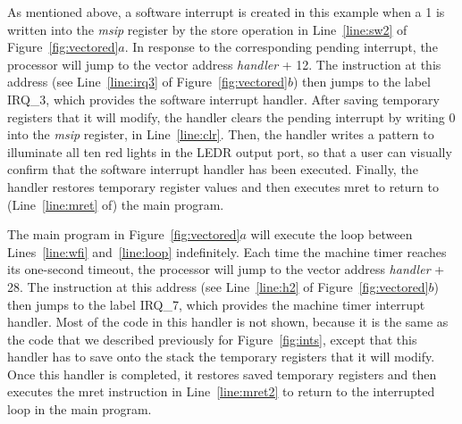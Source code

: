\documentclass[11pt, twoside, pdftex]{article}
\newcommand{\commonPath}{../../Common}
\begin{document}
As mentioned above, a software interrupt is created in this example when a 1 is written
into the {\it msip} register by the store operation in Line~\ref{line:sw2} of 
Figure~\ref{fig:vectored}$a$. In response to the corresponding pending interrupt,
the processor will jump to the vector address {\it handler} + 12. The instruction at this address
(see Line~\ref{line:irq3} of Figure~\ref{fig:vectored}$b$)
then jumps to the label IRQ\_3, which provides the software interrupt handler. 
After saving temporary registers that it will modify, the handler clears the pending
interrupt by writing 0 into the {\it msip} register, in Line~\ref{line:clr}. Then, the
handler writes a pattern to illuminate all ten red lights in the LEDR output port, so that
a user can visually confirm that the software interrupt handler has been executed.
Finally, the handler restores temporary register values and then executes {\sf mret} to 
return to (Line~\ref{line:mret} of) the main program.

The main program in Figure~\ref{fig:vectored}$a$ will execute the loop between 
Lines~\ref{line:wfi} and~\ref{line:loop} indefinitely. Each time the machine timer
reaches its one-second timeout, the processor will jump to the vector address {\it handler} + 28.
The instruction at this address (see Line~\ref{line:h2} of Figure~\ref{fig:vectored}$b$)
then jumps to the label IRQ\_7, which provides the 
machine timer interrupt handler. Most of the code in this handler is not shown, because it
is the same as the code that we described previously for Figure~\ref{fig:ints}, except that this
handler has to save onto the stack the temporary registers that it will modify. Once this 
handler is completed, it restores saved temporary registers and then 
executes the {\sf mret} instruction in Line~\ref{line:mret2}
to return to the interrupted loop in the main program.



\end{document}
